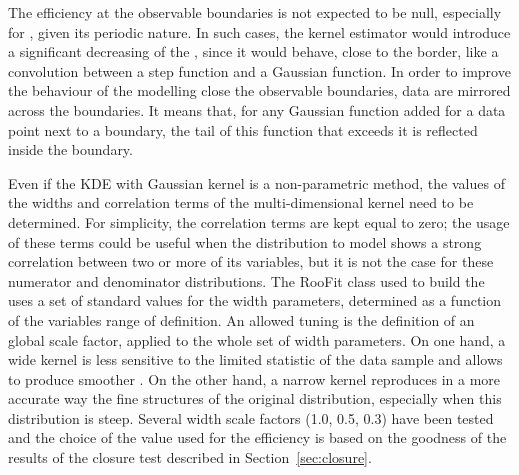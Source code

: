 The efficiency at the observable boundaries is not expected to be null, especially for \PHI, given its periodic nature. 
In such cases, the kernel estimator would introduce a significant decreasing of the \pdf, since it would behave, close to the border, like a convolution between a step function and a Gaussian function.
In order to improve the behaviour of the modelling close the observable boundaries, data are mirrored across the boundaries.
It means that, for any Gaussian function added for a data point next to a boundary, the tail of this function that exceeds it is reflected inside the boundary.

Even if the KDE with Gaussian kernel is a non-parametric method, the values of the widths and correlation terms of the multi-dimensional kernel need to be determined.
For simplicity, the correlation terms are kept equal to zero; the usage of these terms could be useful when the distribution to model shows a strong correlation between two or more of its variables, but it is not the case for these numerator and denominator distributions.
The {\sc RooFit} class used to build the \pdfKDE uses a set of standard values for the width parameters, determined as a function of the variables range of definition.
An allowed tuning is the definition of an global scale factor, applied to the whole set of width parameters.
On one hand, a wide kernel is less sensitive to the limited statistic of the data sample and allows to produce smoother \pdfs.
On the other hand, a narrow kernel reproduces in a more accurate way the fine structures of the original distribution, especially when this distribution is steep.
Several width scale factors (1.0, 0.5, 0.3) have been tested and the choice of the value used for the efficiency is based on the goodness of the results of the closure test described in Section~\ref{sec:closure}.


